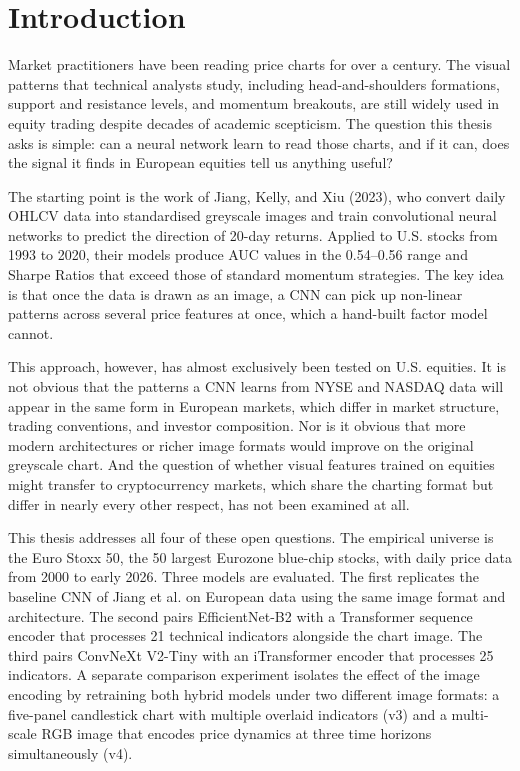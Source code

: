 
\newpage
\section{Introduction}

Market practitioners have been reading price charts for over a century. The visual patterns that technical analysts study, including head-and-shoulders formations, support and resistance levels, and momentum breakouts, are still widely used in equity trading despite decades of academic scepticism. The question this thesis asks is simple: can a neural network learn to read those charts, and if it can, does the signal it finds in European equities tell us anything useful?

The starting point is the work of Jiang, Kelly, and Xiu (2023), who convert daily OHLCV data into standardised greyscale images and train convolutional neural networks to predict the direction of 20-day returns. Applied to U.S. stocks from 1993 to 2020, their models produce AUC values in the 0.54--0.56 range and Sharpe Ratios that exceed those of standard momentum strategies. The key idea is that once the data is drawn as an image, a CNN can pick up non-linear patterns across several price features at once, which a hand-built factor model cannot.

This approach, however, has almost exclusively been tested on U.S. equities. It is not obvious that the patterns a CNN learns from NYSE and NASDAQ data will appear in the same form in European markets, which differ in market structure, trading conventions, and investor composition. Nor is it obvious that more modern architectures or richer image formats would improve on the original greyscale chart. And the question of whether visual features trained on equities might transfer to cryptocurrency markets, which share the charting format but differ in nearly every other respect, has not been examined at all.

This thesis addresses all four of these open questions. The empirical universe is the Euro Stoxx 50, the 50 largest Eurozone blue-chip stocks, with daily price data from 2000 to early 2026. Three models are evaluated. The first replicates the baseline CNN of Jiang et al. on European data using the same image format and architecture. The second pairs EfficientNet-B2 with a Transformer sequence encoder that processes 21 technical indicators alongside the chart image. The third pairs ConvNeXt V2-Tiny with an iTransformer encoder that processes 25 indicators. A separate comparison experiment isolates the effect of the image encoding by retraining both hybrid models under two different image formats: a five-panel candlestick chart with multiple overlaid indicators (v3) and a multi-scale RGB image that encodes price dynamics at three time horizons simultaneously (v4).

